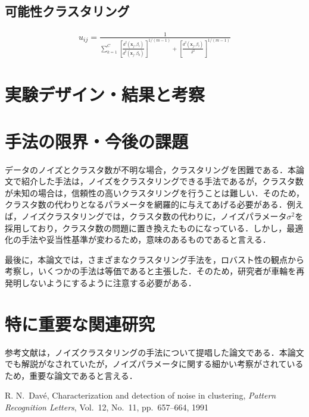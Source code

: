 \documentclass[10pt,onecolumn]{jsarticle}
\begin{document}
\subsection{可能性クラスタリング}

\begin{align}
	u_{i j}=\frac{1}{\sum_{k=1}^{C}\left[\frac{d^{2}\left(\boldsymbol{x}_{j}, \beta_{i}\right)}{d^{2}\left(\boldsymbol{x}_{j}, \beta_{k}\right)}\right]^{1 /(m-1)}+\left[\frac{d^{2}\left(\boldsymbol{x}_{j}, \beta_{i}\right)}{\delta^{2}}\right]^{1 /(m-1)}}
\end{align}


\section{実験デザイン・結果と考察}


\section{手法の限界・今後の課題}
データのノイズとクラスタ数が不明な場合，クラスタリングを困難である．本論文で紹介した手法は，ノイズをクラスタリングできる手法であるが，クラスタ数が未知の場合は，信頼性の高いクラスタリングを行うことは難しい．そのため，クラスタ数の代わりとなるパラメータを網羅的に与えてあげる必要がある．例えば，ノイズクラスタリングでは，クラスタ数の代わりに，ノイズパラメータ$\sigma^2$を採用しており，クラスタ数の問題に置き換えたものになっている．しかし，最適化の手法や妥当性基準が変わるため，意味のあるものであると言える．

最後に，本論文では，さまざまなクラスタリング手法を，ロバスト性の観点から考察し，いくつかの手法は等価であると主張した．そのため，研究者が車輪を再発明しないようにするように注意する必要がある．
\section{特に重要な関連研究}
参考文献\cite{thesis:noise_param}は，ノイズクラスタリングの手法について提唱した論文である．本論文でも解説がなされていたが，ノイズパラメータに関する細かい考察がされているため，重要な論文であると言える．

\begin{thebibliography}{99}
%

R. N.~Dav\'{e}, Characterization and detection of noise in clustering, \textit{Pattern Recognition Letters}, Vol.~12, No.~11, pp.~657--664, 1991

\end{thebibliography}



\end{document}
